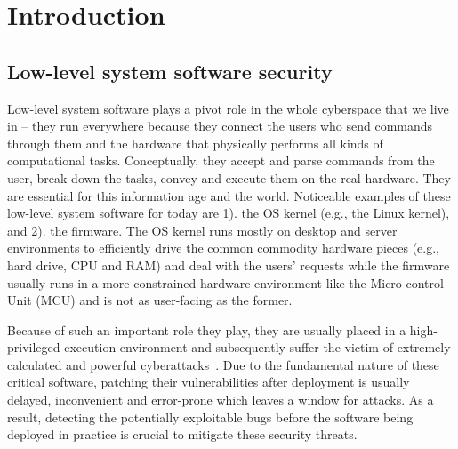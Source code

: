 \section{Introduction}
\subsection{Low-level system software security}
Low-level system software plays a pivot role in the whole cyberspace that we live in -- they run everywhere because they connect the users who send commands through them and the hardware that physically performs all kinds of computational tasks. 
Conceptually, they accept and parse commands from the user, break down the tasks, convey and execute them on the real hardware.  
They are essential for this information age and the world. 
Noticeable examples of these low-level system software for today are 1). the OS kernel (e.g., the Linux kernel), and 2). the firmware. The OS kernel runs mostly on desktop and server environments to efficiently drive the common commodity hardware pieces (e.g., hard drive, CPU and RAM) and deal with the users' requests while the firmware usually runs in a more constrained hardware environment like the Micro-control Unit (MCU) and is not as user-facing as the former. 

Because of such an important role they play, they are usually placed in a high-privileged execution environment and subsequently suffer the victim of extremely calculated and powerful cyberattacks~\cite{kuruvila_hardware-assisted_2021,maggi_attacks_2020,miller_remote_2015}. Due to the fundamental nature of these critical software, patching their vulnerabilities after deployment is usually delayed, inconvenient and error-prone which leaves a window for attacks. As a result, detecting the potentially exploitable bugs before the software being deployed in practice is crucial to mitigate these security threats.  


